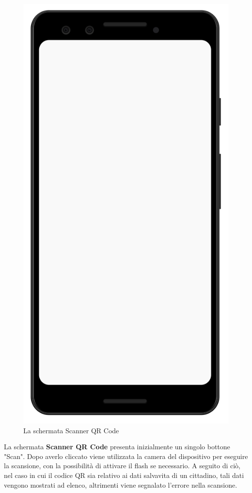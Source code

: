 \documentclass[12pt,a4paper,twoside,openright,titlepage]{book}
\begin{document}
\begin{figure}[H]
\includegraphics[scale = 0.2]{mobile}
\caption{La schermata Scanner QR Code}
\end{figure}
La schermata \textbf{Scanner QR Code} presenta inizialmente un singolo bottone "Scan". Dopo averlo cliccato viene utilizzata la camera del dispositivo per eseguire la scansione, con la possibilità di attivare il flash se necessario. A seguito di ciò, nel caso in cui il codice QR sia relativo ai dati salvavita di un cittadino, tali dati vengono mostrati ad elenco, altrimenti viene segnalato l'errore nella scansione.
\end{document}
